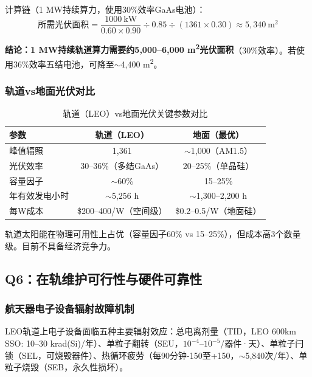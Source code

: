 计算链（1 MW持续算力，使用30\%效率GaAs电池）：
\begin{equation*}
\text{所需光伏面积} = \frac{1000\ \text{kW}}{0.60 \times 0.90} \div 0.85 \div (1361 \times 0.30) \approx 5,340\ \text{m}^2
\end{equation*}

\textbf{结论：1 MW持续轨道算力需要约5,000--6,000 m\textsuperscript{2}光伏面积}（30\%效率）。若使用36\%效率五结电池，可降至$\sim$4,400 m\textsuperscript{2}。

\subsubsection{轨道vs地面光伏对比}

\begin{table}[H]
\centering
\caption{轨道（LEO）vs地面光伏关键参数对比}
\label{tab:pv_compare}
\begin{tabular}{lcc}
\toprule
\textbf{参数} & \textbf{轨道（LEO）} & \textbf{地面（最优）} \\
\midrule
峰值辐照 & 1,361\unitWpm{} & $\sim$1,000\unitWpm{}（AM1.5） \\
光伏效率 & 30--36\%（多结GaAs） & 20--25\%（单晶硅） \\
容量因子 & $\sim$60\% & 15--25\% \\
年有效发电小时 & $\sim$5,256 h & $\sim$1,300--2,200 h \\
每W成本 & \$200--400/W（空间级） & \$0.2--0.5/W（地面硅） \\
\bottomrule
\end{tabular}
\end{table}

轨道太阳能在物理可用性上占优（容量因子60\% vs 15--25\%），但成本高3个数量级。目前不具备经济竞争力\cite{nasa2024iss}。

\subsection{Q6：在轨维护可行性与硬件可靠性}

\subsubsection{航天器电子设备辐射故障机制}

LEO轨道上电子设备面临五种主要辐射效应\cite{nasajpl2025rad,gaoanxin2025rad}：总电离剂量（TID，LEO 600km SSO: 10--30 krad(Si)/年）、单粒子翻转（SEU，$10^{-4}$--$10^{-5}$/器件·天）、单粒子闩锁（SEL，可烧毁器件）、热循环疲劳（每90分钟-150\unitC{}至+150\unitC{}，$\sim$5,840次/年）、单粒子烧毁（SEB，永久性损坏）。

